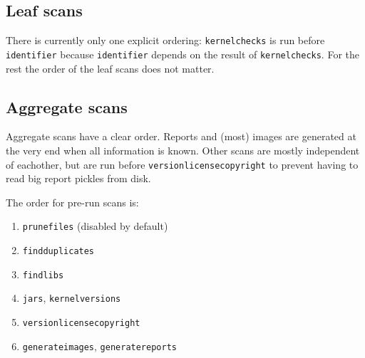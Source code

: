\documentclass[10pt]{article}
\begin{document}
\subsection{Leaf scans}

There is currently only one explicit ordering: \texttt{kernelchecks} is run
before \texttt{identifier} because \texttt{identifier} depends on the result
of \texttt{kernelchecks}. For the rest the order of the leaf scans does not
matter.

\subsection{Aggregate scans}

Aggregate scans have a clear order. Reports and (most) images are generated at
the very end when all information is known. Other scans are mostly independent
of eachother, but are run before \texttt{versionlicensecopyright} to prevent
having to read big report pickles from disk.

The order for pre-run scans is:

\begin{enumerate}
\item \texttt{prunefiles} (disabled by default)
\item \texttt{findduplicates}
\item \texttt{findlibs}
\item \texttt{jars}, \texttt{kernelversions}
\item \texttt{versionlicensecopyright}
\item \texttt{generateimages}, \texttt{generatereports}
\end{enumerate}
\end{document}
